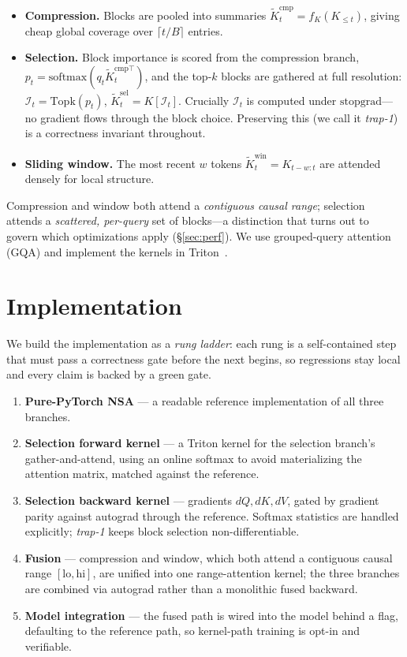 \documentclass[11pt]{article}
\begin{document}
\begin{itemize}[leftmargin=1.2em,itemsep=3pt]
\item \textbf{Compression.} Blocks are pooled into summaries
$\tilde{K}_t^{\mathrm{cmp}}=f_K(K_{\le t})$, giving cheap global coverage over $\lceil t/B\rceil$
entries.
\item \textbf{Selection.} Block importance is scored from the compression branch,
$p_t=\mathrm{softmax}(q_t\tilde{K}_t^{\mathrm{cmp}\top})$, and the top-$k$ blocks are gathered at
full resolution: $\mathcal{I}_t=\mathrm{Topk}(p_t)$, $\tilde{K}_t^{\mathrm{sel}}=K[\mathcal{I}_t]$.
Crucially $\mathcal{I}_t$ is computed under $\mathrm{stopgrad}$---no gradient flows through the block
choice. Preserving this (we call it \emph{trap-1}) is a correctness invariant throughout.
\item \textbf{Sliding window.} The most recent $w$ tokens $\tilde{K}_t^{\mathrm{win}}=K_{t-w:t}$ are
attended densely for local structure.
\end{itemize}

Compression and window both attend a \emph{contiguous causal range}; selection attends a
\emph{scattered, per-query} set of blocks---a distinction that turns out to govern which
optimizations apply (\S\ref{sec:perf}). We use grouped-query attention (GQA) and implement the
kernels in Triton~\cite{triton}.

\section{Implementation}
\label{sec:impl}
We build the implementation as a \emph{rung ladder}: each rung is a self-contained step that must
pass a correctness gate before the next begins, so regressions stay local and every claim is backed
by a green gate.

\begin{enumerate}[leftmargin=1.4em,itemsep=2pt]
\item \textbf{Pure-PyTorch NSA} --- a readable reference implementation of all three branches.
\item \textbf{Selection forward kernel} --- a Triton kernel for the selection branch's
gather-and-attend, using an online softmax to avoid materializing the attention matrix, matched
against the reference.
\item \textbf{Selection backward kernel} --- gradients $dQ, dK, dV$, gated by gradient parity
against autograd through the reference. Softmax statistics are handled explicitly; \emph{trap-1}
keeps block selection non-differentiable.
\item \textbf{Fusion} --- compression and window, which both attend a contiguous causal range
$[\text{lo},\text{hi}]$, are unified into one range-attention kernel; the three branches are
combined via autograd rather than a monolithic fused backward.
\item \textbf{Model integration} --- the fused path is wired into the model behind a flag,
defaulting to the reference path, so kernel-path training is opt-in and verifiable.
\end{enumerate}
\end{document}
